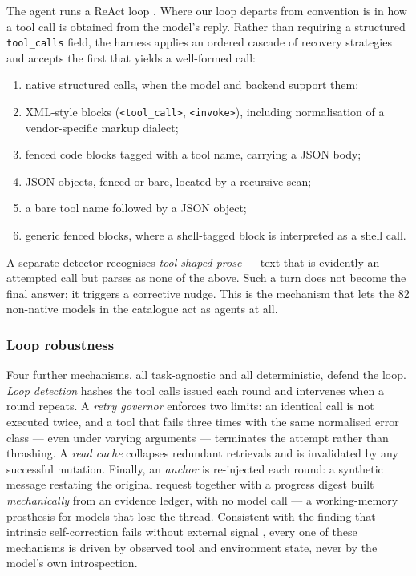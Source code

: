 \documentclass[11pt,a4paper]{article}
\begin{document}
The agent runs a ReAct loop \citep{yao2023react}. Where our loop departs from
convention is in how a tool call is obtained from the model's reply. Rather than
requiring a structured \texttt{tool\_calls} field, the harness applies an ordered
cascade of recovery strategies and accepts the first that yields a well-formed
call:

\begin{enumerate}\itemsep2pt
  \item native structured calls, when the model and backend support them;
  \item XML-style blocks (\texttt{<tool\_call>}, \texttt{<invoke>}), including
        normalisation of a vendor-specific markup dialect;
  \item fenced code blocks tagged with a tool name, carrying a JSON body;
  \item JSON objects, fenced or bare, located by a recursive scan;
  \item a bare tool name followed by a JSON object;
  \item generic fenced blocks, where a shell-tagged block is interpreted as a
        shell call.
\end{enumerate}

A separate detector recognises \emph{tool-shaped prose} --- text that is
evidently an attempted call but parses as none of the above. Such a turn does not
become the final answer; it triggers a corrective nudge. This is the mechanism
that lets the 82 non-native models in the catalogue act as agents at all.

\subsubsection{Loop robustness}
\label{sec:system-robustness}

Four further mechanisms, all task-agnostic and all deterministic, defend the
loop. \emph{Loop detection} hashes the tool calls issued each round and
intervenes when a round repeats. A \emph{retry governor} enforces two limits: an
identical call is not executed twice, and a tool that fails three times with the
same normalised error class --- even under varying arguments --- terminates the
attempt rather than thrashing. A \emph{read cache} collapses redundant retrievals
and is invalidated by any successful mutation. Finally, an \emph{anchor} is
re-injected each round: a synthetic message restating the original request
together with a progress digest built \emph{mechanically} from an evidence
ledger, with no model call --- a working-memory prosthesis for models that lose
the thread. Consistent with the finding that intrinsic self-correction fails
without external signal \citep{huang2024llmscannot}, every one of these
mechanisms is driven by observed tool and environment state, never by the model's
own introspection.
\end{document}
